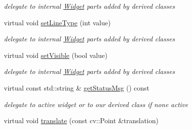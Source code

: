 \begin{DoxyCompactItemize}
\begin{DoxyCompactList}\small\item\em delegate to internal \hyperlink{classcanvascv_1_1Widget}{Widget} parts added by derived classes \end{DoxyCompactList}\item 
virtual void \hyperlink{classcanvascv_1_1CompoundWidget_ac45ea9109d6b73c65b6a631dbc9595c5}{set\+Line\+Type} (int value)\hypertarget{classcanvascv_1_1CompoundWidget_ac45ea9109d6b73c65b6a631dbc9595c5}{}\label{classcanvascv_1_1CompoundWidget_ac45ea9109d6b73c65b6a631dbc9595c5}

\begin{DoxyCompactList}\small\item\em delegate to internal \hyperlink{classcanvascv_1_1Widget}{Widget} parts added by derived classes \end{DoxyCompactList}\item 
virtual void \hyperlink{classcanvascv_1_1CompoundWidget_ab81cd287c73d8ed098d0914596dd40ba}{set\+Visible} (bool value)\hypertarget{classcanvascv_1_1CompoundWidget_ab81cd287c73d8ed098d0914596dd40ba}{}\label{classcanvascv_1_1CompoundWidget_ab81cd287c73d8ed098d0914596dd40ba}

\begin{DoxyCompactList}\small\item\em delegate to internal \hyperlink{classcanvascv_1_1Widget}{Widget} parts added by derived classes \end{DoxyCompactList}\item 
virtual const std\+::string \& \hyperlink{classcanvascv_1_1CompoundWidget_a7b8afb0ea8e8803f201b9ee8aa7e153a}{get\+Status\+Msg} () const \hypertarget{classcanvascv_1_1CompoundWidget_a7b8afb0ea8e8803f201b9ee8aa7e153a}{}\label{classcanvascv_1_1CompoundWidget_a7b8afb0ea8e8803f201b9ee8aa7e153a}

\begin{DoxyCompactList}\small\item\em delegate to active widget or to our derived class if none active \end{DoxyCompactList}\item 
virtual void \hyperlink{classcanvascv_1_1CompoundWidget_a28d73640776bc428f008a9b14facd3f9}{translate} (const cv\+::\+Point \&translation)\hypertarget{classcanvascv_1_1CompoundWidget_a28d73640776bc428f008a9b14facd3f9}{}\label{classcanvascv_1_1CompoundWidget_a28d73640776bc428f008a9b14facd3f9}


\end{DoxyCompactItemize}
